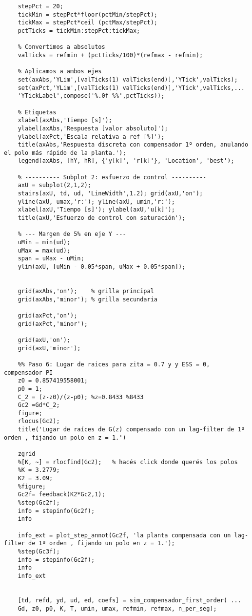\begin{lstlisting}[style=matlabstyle,caption={Primera hoja de cálculos utilizada.},label={matlab:calculo1}]
	% Redondeamos a múltiplos de 20 para ticks
	stepPct = 20;
	tickMin = stepPct*floor(pctMin/stepPct);
	tickMax = stepPct*ceil (pctMax/stepPct);
	pctTicks = tickMin:stepPct:tickMax;
	
	% Convertimos a absolutos
	valTicks = refmin + (pctTicks/100)*(refmax - refmin);
	
	% Aplicamos a ambos ejes
	set(axAbs,'YLim',[valTicks(1) valTicks(end)],'YTick',valTicks);
	set(axPct,'YLim',[valTicks(1) valTicks(end)],'YTick',valTicks,...
	'YTickLabel',compose('%.0f %%',pctTicks));
	
	% Etiquetas
	xlabel(axAbs,'Tiempo [s]');
	ylabel(axAbs,'Respuesta [valor absoluto]');
	ylabel(axPct,'Escala relativa a ref [%]');
	title(axAbs,'Respuesta discreta con compensador 1º orden, anulando el polo más rápido de la planta.');
	legend(axAbs, [hY, hR], {'y[k]', 'r[k]'}, 'Location', 'best');
	
	% ---------- Subplot 2: esfuerzo de control ----------
	axU = subplot(2,1,2);
	stairs(axU, td, ud, 'LineWidth',1.2); grid(axU,'on');
	yline(axU, umax,'r:'); yline(axU, umin,'r:');
	xlabel(axU,'Tiempo [s]'); ylabel(axU,'u[k]');
	title(axU,'Esfuerzo de control con saturación');
	
	% --- Margen de 5% en eje Y ---
	uMin = min(ud);
	uMax = max(ud);
	span = uMax - uMin;
	ylim(axU, [uMin - 0.05*span, uMax + 0.05*span]);
	
	
	grid(axAbs,'on');    % grilla principal
	grid(axAbs,'minor'); % grilla secundaria
	
	grid(axPct,'on');
	grid(axPct,'minor');
	
	grid(axU,'on');
	grid(axU,'minor');
	
	%% Paso 6: Lugar de raices para zita = 0.7 y y ESS = 0, compensador PI
	z0 = 0.857419558001;
	p0 = 1;
	C_2 = (z-z0)/(z-p0); %z=0.8433 %8433
	Gc2 =Gd*C_2;
	figure;
	rlocus(Gc2);
	title('Lugar de raíces de G(z) compensado con un lag-filter de 1º orden , fijando un polo en z = 1.')
	
	zgrid
	%[K, ~] = rlocfind(Gc2);   % hacés click donde querés los polos
	%K = 3.2779;
	K2 = 3.09;
	%figure;
	Gc2f= feedback(K2*Gc2,1);
	%step(Gc2f);
	info = stepinfo(Gc2f);
	info
	
	info_ext = plot_step_annot(Gc2f, 'la planta compensada con un lag-filter de 1º orden , fijando un polo en z = 1.');
	%step(Gc3f);
	info = stepinfo(Gc2f);
	info
	info_ext
	
	
	[td, refd, yd, ud, ed, coefs] = sim_compensador_first_order( ...
	Gd, z0, p0, K, T, umin, umax, refmin, refmax, n_per_seg);
	

\end{lstlisting}
